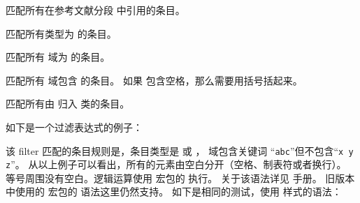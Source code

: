\begin{optionlist*}



匹配所有在参考文献分段  中引用的条目。



匹配所有类型为  的条目。



匹配所有  域为  的条目。



匹配所有  域包含  的条目。
如果  包含空格，那么需要用括号括起来。



匹配所有由  归入  类的条目。

\end{optionlist*}

如下是一个过滤表达式的例子：

\begin{ltxexample}[style=latex,keywords={and,or,not,type,keyword}]{}
\end{ltxexample}
%
该 filter 匹配的条目规则是，条目类型是  或 ， 域包含关键词 “\texttt{abc}”但不包含“\texttt{x y z}”。
从以上例子可以看出，所有的元素由空白分开（空格、制表符或者换行）。
等号周围没有空白。逻辑运算使用  宏包的  执行。
关于该语法详见  手册。
\biblatex 旧版本中使用的  宏包的  语法这里仍然支持。
如下是相同的测试，使用  样式的语法：

